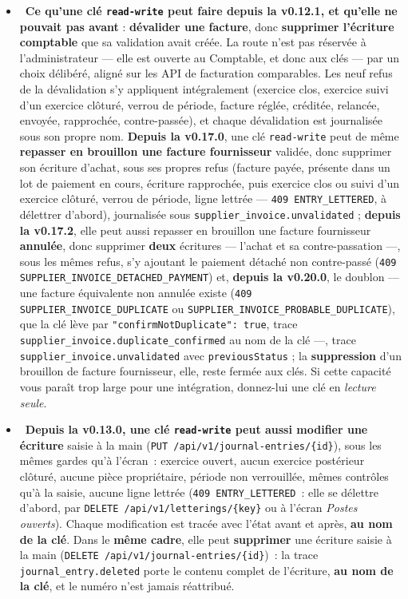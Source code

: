\documentclass[a4paper,11pt,oneside]{article}
\begin{document}
\begin{itemize}
    \item \keshAttention\ \textbf{Ce qu'une clé \texttt{read-write} peut faire depuis la v0.12.1, et qu'elle ne pouvait pas avant} : \textbf{dévalider une facture}, donc \textbf{supprimer l'écriture comptable} que sa validation avait créée. La route n'est pas réservée à l'administrateur --- elle est ouverte au Comptable, et donc aux clés --- par un choix délibéré, aligné sur les API de facturation comparables. Les neuf refus de la dévalidation s'y appliquent intégralement (exercice clos, exercice suivi d'un exercice clôturé, verrou de période, facture réglée, créditée, relancée, envoyée, rapprochée, contre-passée), et chaque dévalidation est journalisée sous son propre nom. \textbf{Depuis la v0.17.0}, une clé \texttt{read-write} peut de même \textbf{repasser en brouillon une facture fournisseur} validée, donc supprimer son écriture d'achat, sous ses propres refus (facture payée, présente dans un lot de paiement en cours, écriture rapprochée, puis exercice clos ou suivi d'un exercice clôturé, verrou de période, ligne lettrée --- \texttt{409 ENTRY\_\allowbreak LETTERED}, à délettrer d'abord), journalisée sous \texttt{supplier\_invoice.unvalidated} ; \textbf{depuis la v0.17.2}, elle peut aussi repasser en brouillon une facture fournisseur \textbf{annulée}, donc supprimer \textbf{deux} écritures --- l'achat et sa contre-passation ---, sous les mêmes refus, s'y ajoutant le paiement détaché non contre-passé (\texttt{409 SUPPLIER\_\allowbreak INVOICE\_\allowbreak DETACHED\_\allowbreak PAYMENT}) et, \textbf{depuis la v0.20.0}, le doublon --- une facture équivalente non annulée existe (\texttt{409 SUPPLIER\_\allowbreak INVOICE\_\allowbreak DUPLICATE} ou \texttt{SUPPLIER\_\allowbreak INVOICE\_\allowbreak PROBABLE\_\allowbreak DUPLICATE}), que la clé lève par \texttt{"confirmNotDuplicate": true}, trace \texttt{supplier\_invoice.duplicate\_confirmed} au nom de la clé ---, trace \texttt{supplier\_invoice.unvalidated} avec \texttt{previousStatus} ; la \textbf{suppression} d'un brouillon de facture fournisseur, elle, reste fermée aux clés. Si cette capacité vous paraît trop large pour une intégration, donnez-lui une clé en \emph{lecture seule}.
    \item \keshAttention\ \textbf{Depuis la v0.13.0, une clé \texttt{read-write} peut aussi modifier une écriture} saisie à la main (\texttt{PUT /api/v1/journal-entries/\{id\}}), sous les mêmes gardes qu'à l'écran~: exercice ouvert, aucun exercice postérieur clôturé, aucune pièce propriétaire, période non verrouillée, mêmes contrôles qu'à la saisie, aucune ligne lettrée (\texttt{409 ENTRY\_LETTERED}~: elle se délettre d'abord, par \texttt{DELETE /api/v1/letterings/\{key\}} ou à l'écran \emph{Postes ouverts}). Chaque modification est tracée avec l'état avant et après, \textbf{au nom de la clé}. Dans le \textbf{même cadre}, elle peut \textbf{supprimer} une écriture saisie à la main (\texttt{DELETE /api/v1/journal-entries/\{id\}})~: la trace \texttt{journal\_entry.deleted} porte le contenu complet de l'écriture, \textbf{au nom de la clé}, et le numéro n'est jamais réattribué.

\end{itemize}
\end{document}
